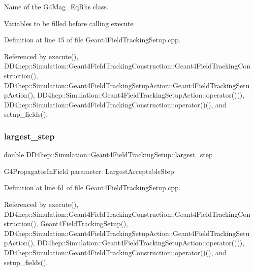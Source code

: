 Name of the G4\+Mag\+\_\+\+Eq\+Rhs class. 

Variables to be filled before calling execute 

Definition at line 45 of file Geant4\+Field\+Tracking\+Setup.\+cpp.



Referenced by execute(), D\+D4hep\+::\+Simulation\+::\+Geant4\+Field\+Tracking\+Construction\+::\+Geant4\+Field\+Tracking\+Construction(), D\+D4hep\+::\+Simulation\+::\+Geant4\+Field\+Tracking\+Setup\+Action\+::\+Geant4\+Field\+Tracking\+Setup\+Action(), D\+D4hep\+::\+Simulation\+::\+Geant4\+Field\+Tracking\+Setup\+Action\+::operator()(), D\+D4hep\+::\+Simulation\+::\+Geant4\+Field\+Tracking\+Construction\+::operator()(), and setup\+\_\+fields().

\hypertarget{struct_d_d4hep_1_1_simulation_1_1_geant4_field_tracking_setup_a24ad8216cbc0b9c7991c9818a527fb76}{}\label{struct_d_d4hep_1_1_simulation_1_1_geant4_field_tracking_setup_a24ad8216cbc0b9c7991c9818a527fb76} 
\subsubsection{\texorpdfstring{largest\+\_\+step}{largest\_step}}
{\footnotesize\ttfamily double D\+D4hep\+::\+Simulation\+::\+Geant4\+Field\+Tracking\+Setup\+::largest\+\_\+step\hspace{0.3cm}{\ttfamily [protected]}}



G4\+Propagator\+In\+Field parameter\+: Largest\+Acceptable\+Step. 



Definition at line 61 of file Geant4\+Field\+Tracking\+Setup.\+cpp.



Referenced by execute(), D\+D4hep\+::\+Simulation\+::\+Geant4\+Field\+Tracking\+Construction\+::\+Geant4\+Field\+Tracking\+Construction(), Geant4\+Field\+Tracking\+Setup(), D\+D4hep\+::\+Simulation\+::\+Geant4\+Field\+Tracking\+Setup\+Action\+::\+Geant4\+Field\+Tracking\+Setup\+Action(), D\+D4hep\+::\+Simulation\+::\+Geant4\+Field\+Tracking\+Setup\+Action\+::operator()(), D\+D4hep\+::\+Simulation\+::\+Geant4\+Field\+Tracking\+Construction\+::operator()(), and setup\+\_\+fields().

